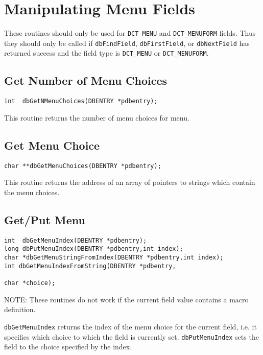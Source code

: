 \section{Manipulating Menu Fields}

These routines should only be used for \verb|DCT_MENU| and \verb|DCT_MENUFORM| fields. Thus they should only be called if 
\verb|dbFindField|, \verb|dbFirstField|, or \verb|dbNextField| has returned success and the field type is \verb|DCT_MENU| or 
\verb|DCT_MENUFORM|.

\subsection{Get Number of Menu Choices}

\begin{verbatim}
int  dbGetNMenuChoices(DBENTRY *pdbentry);
\end{verbatim}

This routine returns the number of menu choices for menu.

\subsection{Get Menu Choice}

\begin{verbatim}
char **dbGetMenuChoices(DBENTRY *pdbentry);
\end{verbatim}

This routine returns the address of an array of pointers to strings which contain the menu choices.

\subsection{Get/Put Menu}

\begin{verbatim}
int  dbGetMenuIndex(DBENTRY *pdbentry);
long dbPutMenuIndex(DBENTRY *pdbentry,int index);
char *dbGetMenuStringFromIndex(DBENTRY *pdbentry,int index);
int dbGetMenuIndexFromString(DBENTRY *pdbentry,

char *choice);
\end{verbatim}

NOTE: These routines do not work if the current field value contains a macro definition.

\verb|dbGetMenuIndex| returns the index of the menu choice for the current field, i.e. it specifies which choice to which the 
field is currently set. \verb|dbPutMenuIndex| sets the field to the choice specified by the index.

